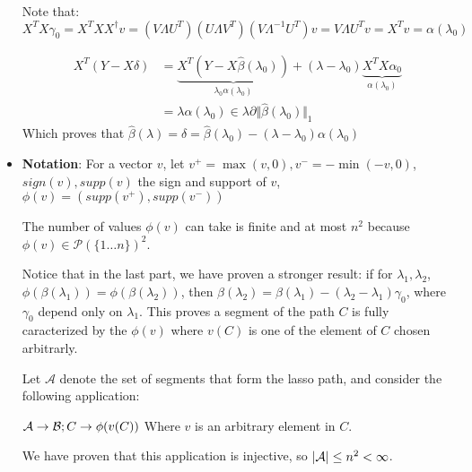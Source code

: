 \documentclass[12pt]{article}
\newcommand{\norm}[1]{\Vert #1 \Vert}
\begin{document}
\begin{itemize}
  Note that:
  $$X^TX\gamma_0 = X^T XX^{\dagger} v = (V \Lambda U^T) (U\Lambda V^T)  (V \Lambda^{-1} U^T) v = V \Lambda U^T v = X^T v = \alpha(\lambda_0)$$
  
  
  \begin{align*}
    X^T(Y - X\delta)
    &= \underbrace{X^T(Y - X\hat \beta(\lambda_0))}_{\lambda_0 \alpha(\lambda_0)} + (\lambda - \lambda_0) \underbrace{X^T X \alpha_0}_{\alpha(\lambda_0)}
    \\&= \lambda \alpha(\lambda_0) \in \lambda \partial \norm{\hat \beta(\lambda_0)}_1
  \end{align*}
  Which proves that $\hat \beta(\lambda) = \delta = \hat \beta(\lambda_0) - (\lambda - \lambda_0) \alpha(\lambda_0)$

  
\item
  \textbf{Notation}: For a vector $v$, let $v^+ = \max(v, 0), v^- = -\min(-v, 0)$, $sign(v), supp(v)$ the sign and support of $v$, $\phi(v) = (supp(v^+), supp(v^-))$
  
  The number of values $\phi(v)$ can take is finite and at most $n^2$ because $\phi(v) \in \mathcal P(\{1 \ldots n\})^2$.

  Notice that in the last part, we have proven a stronger result:
  if for $\lambda_1, \lambda_2$, $\phi(\beta(\lambda_1)) = \phi(\beta(\lambda_2))$, then $\beta(\lambda_2) = \beta(\lambda_1) - (\lambda_2 - \lambda_1) \gamma_0$, where $\gamma_0$ depend only on $\lambda_1$. This proves a segment of the path $C$ is fully caracterized by the $\phi(v)$ where $v(C)$ is one of the element of $C$ chosen arbitrarly.
  

  Let $\mathcal A$ denote the set of segments that form the lasso path, and consider the following application:
  
  ${\cal A} \rightarrow {\cal B}; C \rightarrow \phi(v(C)) $  Where $v$ is an arbitrary element in $C$.

  We have proven that this application is injective, so $|{\cal A}| \le n^2 < \infty $.

\end{itemize}
\end{document}
